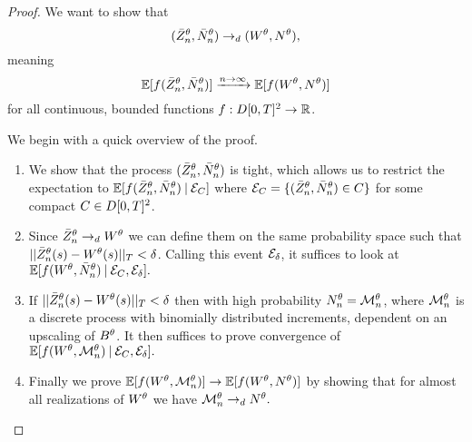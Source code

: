 \begin{proof}



We want to show that
\begin{equation}
(\bar{Z}^{\theta}_n, \bar{N}_n^{\theta}) \rightarrow_d (W^{\theta}, N^{\theta}),
\end{equation}
meaning 
\begin{equation}
\mathbb{E}[f(\bar{Z}^{\theta}_n, \bar{N}_n^{\theta})] \xrightarrow{n \rightarrow \infty} \mathbb{E}[f(W^{\theta}, N^{\theta})]
\end{equation}
for all continuous, bounded functions $f:D[0,T]^2\rightarrow\mathbb{R}$.

We begin with a quick overview of the proof.
\begin{enumerate}
	\item We show that the process $(\bar{Z}^{\theta}_n, \bar{N}_n^{\theta})$ is tight,
	which allows us to restrict the expectation to
	\begin{math}
		\mathbb{E}[f(\bar{Z}^{\theta}_n, \bar{N}_n^{\theta}) \: | \: \mathcal{E}_{C}]
	\end{math}
	where
	\begin{math}
		\mathcal{E}_{C} = \{ (\bar{Z}^{\theta}_n, \bar{N}_n^{\theta}) \in C \}
	\end{math}
	for some compact $C \in D[0, T]^2$.
	
	\item Since $\bar{Z}^{\theta}_n \rightarrow_d W^{\theta}$ we can define them on the same probability space such that
	$||\bar{Z}^{\theta}_n(s) - W^{\theta}(s)||_T < \delta$. 
	Calling this event $\mathcal{E}_{\delta}$,
	it suffices to look at
	\begin{math}
	\mathbb{E}[f(W^{\theta}, \bar{N}_n^{\theta}) \: | \: \mathcal{E}_{C}, \mathcal{E}_{\delta}].
	\end{math}
	
	\item If $||\bar{Z}^{\theta}_n(s) - W^{\theta}(s)||_T < \delta$ then with high probability $N_n^{\theta} = \mathcal{M}_n^{\theta}$,
	where $\mathcal{M}_n^{\theta}$ is a discrete process with binomially distributed increments,
	dependent on an upscaling of $B^{\theta}$.
	It then suffices to prove convergence of 
	\begin{math}
		\mathbb{E}[f(W^{\theta}, \mathcal{M}_n^{\theta}) \: | \: \mathcal{E}_{C}, \mathcal{E}_{\delta}].
	\end{math}	
	
	\item Finally we prove
	\begin{math}
		\mathbb{E}[f(W^{\theta}, \mathcal{M}_n^{\theta})] \rightarrow \mathbb{E}[f(W^{\theta}, N^{\theta})]
	\end{math}
	by showing that for almost all realizations of $W^{\theta}$ we have
	\begin{math}
		\mathcal{M}_n^{\theta} \rightarrow_d N^{\theta}.
	\end{math}
\end{enumerate}



\end{proof}
